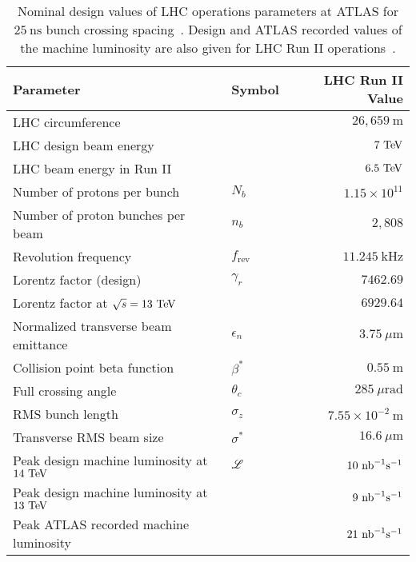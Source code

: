 \begin{table}[htpb]
 \centering
 \caption[Nominal design values of LHC operations parameters at ATLAS for $25~\textrm{ns}$ bunch crossing spacing]{%
  Nominal design values of LHC operations parameters at ATLAS for $25~\textrm{ns}$ bunch crossing spacing~\cite{Evans:2008,PhysRevAccelBeams.19.101003}.
  Design and ATLAS recorded values of the machine luminosity are also given for LHC Run II operations~\cite{TWiki:2018ATLASPeakLumi}.
 }
 \begin{tabular}{@{}llr@{}} \toprule
  Parameter                                   & Symbol             & LHC Run II Value                \\ \midrule
  LHC circumference                           &                    & $26,659~\mathrm{m}$             \\
  LHC design beam energy                      &                    & $7~\text{Te\kern-0.1em V}$                        \\
  LHC beam energy in Run II                   &                    & $6.5~\text{Te\kern-0.1em V}$                      \\
  Number of protons per bunch                 & $N_{b}$            & $1.15 \times 10^{11}$           \\
  Number of proton bunches per beam           & $n_{b}$            & $2,808$                         \\
  Revolution frequency                        & $f_{\textrm{rev}}$ & $11.245~\mathrm{kHz}$           \\
  Lorentz factor (design)                     & $\gamma_{r}$       & $7462.69$                       \\
  Lorentz factor at $\sqrt{s} = 13~\text{Te\kern-0.1em V}$      &                    & $6929.64$                       \\
  Normalized transverse beam emittance        & $\epsilon_{n}$     & $3.75~\mu\mathrm{m}$            \\
  Collision point beta function               & $\beta^{*}$        & $0.55~\mathrm{m}$               \\
  Full crossing angle                         & $\theta_{c}$       & $285~\mu\mathrm{rad}$           \\
  RMS bunch length                            & $\sigma_{z}$       & $7.55\times 10^{-2}~\mathrm{m}$ \\
  Transverse RMS beam size                    & $\sigma^{*}$       & $16.6~\mu\mathrm{m}$            \\ \midrule
  Peak design machine luminosity at $14~\text{Te\kern-0.1em V}$ & $\mathscr{L}$      & $10~\mathrm{nb}^{-1}\mathrm{s}^{-1}$        \\
  Peak design machine luminosity at $13~\text{Te\kern-0.1em V}$ &                    & $9~\mathrm{nb}^{-1}\mathrm{s}^{-1}$         \\
  Peak ATLAS recorded machine luminosity      &                    & $21~\mathrm{nb}^{-1}\mathrm{s}^{-1}$        \\
  \bottomrule
 \end{tabular}\label{table:LHC_collider_parameters}%
\end{table}

